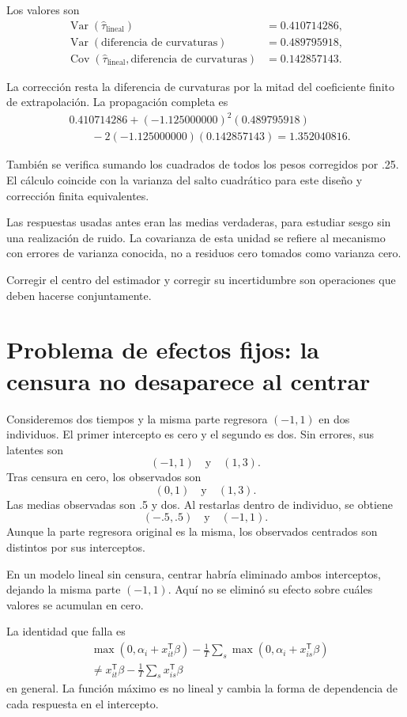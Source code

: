 \documentclass[11pt,a4paper]{article}
\newcommand{\T}{^{\mathsf T}}
\DeclareMathOperator{\Var}{Var}
\DeclareMathOperator{\Cov}{Cov}
\begin{document}
Los valores son
\[
\begin{aligned}
\Var(\widehat\tau_{\mathrm{lineal}})&=0.410714286,\\
\Var(\text{diferencia de curvaturas})&=0.489795918,\\
\Cov(\widehat\tau_{\mathrm{lineal}},
\text{diferencia de curvaturas})&=0.142857143.\end{aligned}
\]

La corrección resta la diferencia
de curvaturas por la mitad del
coeficiente finito de extrapolación.
La propagación completa es
\[
\begin{aligned}
&0.410714286+\left(-1.125000000\right)^2(0.489795918)\\
&\qquad-2(-1.125000000)(0.142857143)
=1.352040816.\end{aligned}
\]

También se verifica sumando
los cuadrados de todos
los pesos corregidos por .25.
El cálculo coincide con
la varianza del salto cuadrático
para este diseño y
corrección finita equivalentes.

Las respuestas usadas antes eran
las medias verdaderas,
para estudiar sesgo sin
una realización de ruido.
La covarianza de esta unidad
se refiere al mecanismo
con errores de varianza conocida,
no a residuos cero
tomados como varianza cero.

Corregir el centro del estimador
y corregir su incertidumbre
son operaciones que deben
hacerse conjuntamente.

\clearpage
\section{Problema de efectos fijos: la censura no desaparece al centrar}\label{unidad170}
Consideremos dos tiempos y
la misma parte regresora
\((-1,1)\) en dos individuos.
El primer intercepto es cero
y el segundo es dos.
Sin errores, sus latentes son
\[
(-1,1)\quad\text{y}\quad(1,3).
\]
Tras censura en cero,
los observados son
\[
(0,1)\quad\text{y}\quad(1,3).
\]
Las medias observadas son .5 y dos.
Al restarlas dentro de individuo,
se obtiene
\[
(-.5,.5)\quad\text{y}\quad(-1,1).
\]
Aunque la parte regresora
original es la misma,
los observados centrados
son distintos por sus interceptos.

En un modelo lineal sin
censura, centrar habría
eliminado ambos interceptos,
dejando la misma parte
\((-1,1)\).
Aquí no se eliminó
su efecto sobre cuáles
valores se acumulan en cero.

La identidad que falla es
\[
\begin{aligned}
&\max(0,\alpha_i+x_{it}\T\beta)
-\frac1T\sum_s\max(0,\alpha_i+x_{is}\T\beta)\\
&\ne x_{it}\T\beta-\frac1T\sum_sx_{is}\T\beta
\end{aligned}
\]
en general.
La función máximo es no lineal
y cambia la forma de
dependencia de cada respuesta
en el intercepto.
\end{document}
